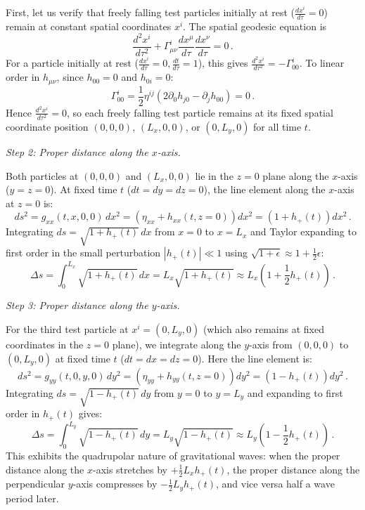\documentclass[12pt]{article}
\newcommand{\be}{\begin{equation}}
\newcommand{\ee}{\end{equation}}
\begin{document}
\begin{enumerate}[label=\alph*)]
First, let us verify that freely falling test particles initially at rest ($\frac{dx^i}{d\tau} = 0$) remain at constant spatial coordinates $x^i$. The spatial geodesic equation is
\be
\frac{d^2 x^i}{d\tau^2} + \Gamma^i_{\mu\nu} \frac{dx^\mu}{d\tau} \frac{dx^\nu}{d\tau} = 0 \,.
\ee
For a particle initially at rest ($\frac{dx^i}{d\tau} = 0, \frac{dt}{d\tau} = 1$), this gives $\frac{d^2 x^i}{d\tau^2} = -\Gamma^i_{00}$. To linear order in $h_{\mu\nu}$, since $h_{00} = 0$ and $h_{0i} = 0$:
\be
\Gamma^i_{00} = \frac{1}{2} \eta^{ij} \left( 2 \partial_0 h_{j0} - \partial_j h_{00} \right) = 0 \,.
\ee
Hence $\frac{d^2 x^i}{d\tau^2} = 0$, so each freely falling test particle remains at its fixed spatial coordinate position $(0,0,0)$, $(L_x,0,0)$, or $(0,L_y,0)$ for all time $t$.

\medskip
\emph{Step 2: Proper distance along the $x$-axis.}

Both particles at $(0,0,0)$ and $(L_x,0,0)$ lie in the $z = 0$ plane along the $x$-axis ($y = z = 0$). At fixed time $t$ ($dt = dy = dz = 0$), the line element along the $x$-axis at $z = 0$ is:
\be
ds^2 = g_{xx}(t,x,0,0)\, dx^2 = \left( \eta_{xx} + h_{xx}(t, z=0) \right) dx^2 = \left( 1 + h_{+}(t) \right) dx^2 \,.
\ee
Integrating $ds = \sqrt{1 + h_{+}(t)}\, dx$ from $x = 0$ to $x = L_x$ and Taylor expanding to first order in the small perturbation $|h_{+}(t)| \ll 1$ using $\sqrt{1 + \epsilon} \approx 1 + \frac{1}{2}\epsilon$:
\be
\Delta s = \int_0^{L_x} \sqrt{1 + h_{+}(t)}\, dx = L_x \sqrt{1 + h_{+}(t)} \approx L_x \left( 1 + \frac{1}{2} h_{+}(t) \right) \,.
\ee

\medskip
\emph{Step 3: Proper distance along the $y$-axis.}

For the third test particle at $x^i = (0, L_y, 0)$ (which also remains at fixed coordinates in the $z = 0$ plane), we integrate along the $y$-axis from $(0,0,0)$ to $(0,L_y,0)$ at fixed time $t$ ($dt = dx = dz = 0$). Here the line element is:
\be
ds^2 = g_{yy}(t,0,y,0)\, dy^2 = \left( \eta_{yy} + h_{yy}(t, z=0) \right) dy^2 = \left( 1 - h_{+}(t) \right) dy^2 \,.
\ee
Integrating $ds = \sqrt{1 - h_{+}(t)}\, dy$ from $y = 0$ to $y = L_y$ and expanding to first order in $h_{+}(t)$ gives:
\be
\Delta s = \int_0^{L_y} \sqrt{1 - h_{+}(t)}\, dy = L_y \sqrt{1 - h_{+}(t)} \approx L_y \left( 1 - \frac{1}{2} h_{+}(t) \right) \,.
\ee
This exhibits the quadrupolar nature of gravitational waves: when the proper distance along the $x$-axis stretches by $+\frac{1}{2} L_x h_{+}(t)$, the proper distance along the perpendicular $y$-axis compresses by $-\frac{1}{2} L_y h_{+}(t)$, and vice versa half a wave period later.


\end{enumerate}
\end{document}
